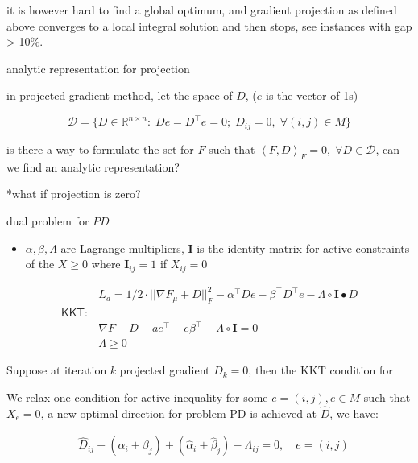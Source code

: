 \documentclass[
  10pt,
  a4paper,
,tablecaptionabove
]{scrartcl}
\providecommand{\tightlist}{%
  \setlength{\itemsep}{0pt}\setlength{\parskip}{0pt}}
\renewenvironment{quote}{\begin{customblockquote}\list{}{\rightmargin=0em\leftmargin=0em}%
\item\relax\color{blockquote-text}\ignorespaces}{\unskip\unskip\endlist\end{customblockquote}}
\begin{document}
it is however hard to find a global optimum, and gradient projection as
defined above converges to a local integral solution and then stops, see
instances with gap \textgreater{} 10\%.

\begin{quote}
analytic representation for projection
\end{quote}

in projected gradient method, let the space of \(D\), (\(e\) is the
vector of 1s)

\[\mathcal D = \{D\in\mathbb{R}^{n\times n} : \; D e = D^\top e = 0;\; D_{ij} = 0,\;\forall  (i,j) \in M \}\]

is there a way to formulate the set for \(F\) such that
\(\left <F, D \right>_F = 0, \; \forall D\in \mathcal D\), can we find
an analytic representation?

\begin{quote}
*what if projection is zero?
\end{quote}

dual problem for \(PD\)

\begin{itemize}
\tightlist
\item
  \(\alpha,\beta,\Lambda\) are Lagrange multipliers, \(\mathbf I\) is
  the identity matrix for active constraints of the \(X \ge 0\) where
  \(\mathbf I_{ij} = 1\) if \(X_{ij} = 0\)
\end{itemize}

\[\begin{aligned}
& L_d = 1/2\cdot ||\nabla F_\mu + D ||_F^2 - \alpha^\top De - \beta^\top D^\top e -\Lambda \circ \mathbf I \bullet D\\
\mathsf{KKT:} & \\
& \nabla F+D - ae^\top - e\beta^\top -\Lambda \circ \mathbf{I} = 0 \\
& \Lambda \ge 0
\end{aligned}\]

Suppose at iteration \(k\) projected gradient \(D_k = 0\), then the KKT
condition for

We relax one condition for active inequality for some
\(e = (i,j), e \in M\) such that \(X_e =0\), a new optimal direction for
problem PD is achieved at \(\hat D\), we have:

\[\begin{aligned}
 & \hat D_{ij} - (\alpha_i + \beta_j) + (\hat \alpha_i + \hat \beta_j) - \Lambda_{ij} = 0, \quad e = (i,j) \\
\end{aligned}\]
\end{document}
